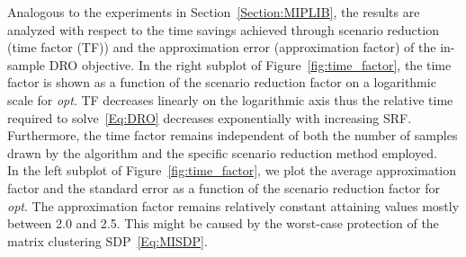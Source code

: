 \documentclass{article}
\begin{document}
Analogous to the experiments in Section~\ref{Section:MIPLIB}, the results are analyzed with respect to the time savings achieved through scenario reduction (time factor (TF)) and the approximation error (approximation factor) of the in-sample DRO objective.
In the right subplot of Figure~\ref{fig:time_factor}, the time factor is shown as a function of the scenario reduction factor on a logarithmic scale for \emph{opt}.
	TF decreases linearly on the logarithmic axis thus the relative time required to solve~\eqref{Eq:DRO} decreases exponentially with increasing SRF.
	Furthermore, the time factor remains independent of both the number of samples drawn by the algorithm and the specific scenario reduction method employed.\\
	In the left subplot of Figure~\ref{fig:time_factor}, we plot the average approximation factor and the standard error as a function of the scenario reduction factor for \emph{opt}.
	The approximation factor remains relatively constant attaining values mostly between 2.0 and 2.5.
	This might be caused by the worst-case protection of the matrix clustering SDP~\eqref{Eq:MISDP}.

\end{document}
